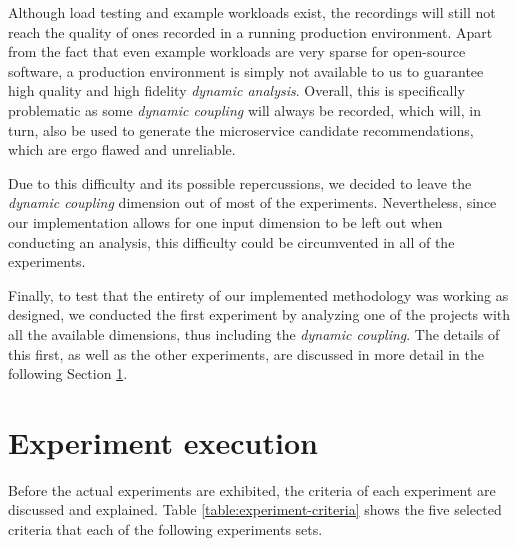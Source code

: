 \documentclass[12pt,a4paper]{report}
\begin{document}
Although load testing and example workloads exist, the recordings will still
not reach the quality of ones recorded in a running production environment.
Apart from the fact that even example workloads are very sparse for open-source
software, a production environment is simply not available to us to guarantee
high quality and high fidelity \textit{dynamic analysis}. Overall, this is
specifically problematic as some \textit{dynamic coupling} will always be
recorded, which will, in turn, also be used to generate the microservice
candidate recommendations, which are ergo flawed and unreliable.

Due to this difficulty and its possible repercussions, we decided to leave the
\textit{dynamic coupling} dimension out of most of the experiments.
Nevertheless, since our implementation allows for one input dimension to be
left out when conducting an analysis, this difficulty could be circumvented in
all of the experiments.

Finally, to test that the entirety of our implemented methodology was working
as designed, we conducted the first experiment by analyzing one of the projects
with all the available dimensions, thus including the \textit{dynamic coupling}.
The details of this first, as well as the other experiments, are discussed in
more detail in the following Section \ref{sect:experiment-execution}.



\section{Experiment execution} \label{sect:experiment-execution}

Before the actual experiments are exhibited, the criteria of each experiment
are discussed and explained. Table \ref{table:experiment-criteria} shows the
five selected criteria that each of the following experiments sets.
\end{document}
